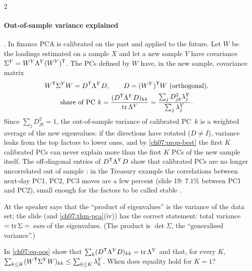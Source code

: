 \begin{paracol}{2}
\paragraph{Out-of-sample variance explained} . In finance PCA is calibrated on the past and
applied to the future. Let $W$ be the loadings estimated on a sample $X$ and let a new sample $Y$ have
covariance $\Sigma^Y=W^Y\Lambda^Y(W^Y)^{\mathsf T}$. The PCs defined by $W$ have, in the new sample, covariance matrix
\begin{equation}\label{ch07:eq-oos}\begin{gathered}
  W^{\mathsf T}\Sigma^YW=D^{\mathsf T}\Lambda^YD,\qquad D=(W^Y)^{\mathsf T} W\ \text{(orthogonal)},\\
  \text{share of PC }k=\frac{(D^{\mathsf T}\Lambda^YD)_{kk}}{\operatorname{tr}\Lambda^Y}=\frac{\sum_jD_{jk}^2\lambda^Y_j}{\sum_j\lambda^Y_j}.\end{gathered}
\end{equation}
Since $\sum_jD_{jk}^2=1$, the out-of-sample variance of calibrated PC~$k$ is a weighted average of the new
eigenvalues: if the directions have rotated ($D\neq I$), variance leaks from the top factors to lower ones, and
by \cref{ch07:prop-best} the first $K$ calibrated PCs can never explain more than the first $K$ PCs of the new
sample itself. The off-diagonal entries of $D^{\mathsf T}\Lambda^YD$ show that calibrated PCs are no longer uncorrelated
out of sample : in the Treasury example the correlations between next-day PC1, PC2, PC3 moves
are a few percent (slide 19: $7.1\%$ between PC1 and PC2), small enough for the factors to be called stable
.

\begin{coursenote}
At  the speaker says that the ``product of eigenvalues'' is the variance of the data set; the
slide (and \cref{ch07:thm-pca}(iv)) has the correct statement: total variance $=\operatorname{tr}\Sigma=$ \emph{sum} of the
eigenvalues. (The product is $\det\Sigma$, the ``generalised variance''.)
\end{coursenote}

\begin{exercise}\label{ch07:ex-oos}
In \eqref{ch07:eq-oos} show that $\sum_k(D^{\mathsf T}\Lambda^YD)_{kk}=\operatorname{tr}\Lambda^Y$ and that, for every $K$,
$\sum_{k\le K}(W^{\mathsf T}\Sigma^YW)_{kk}\le\sum_{k\le K}\lambda^Y_k$. When does equality hold for $K=1$?
\end{exercise}


\end{paracol}
